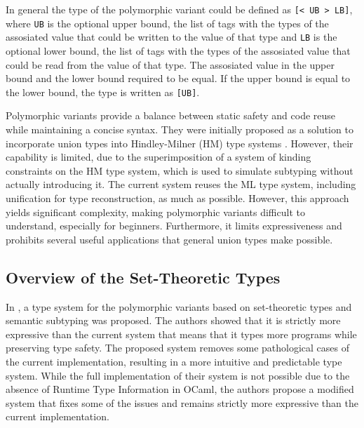 \documentclass[a4paper,11pt,oneside]{article}
\theoremstyle{definition}
\begin{document}
In general the type of the polymorphic variant could be defined as \texttt{[< UB > LB]}, where \texttt{UB} is the optional upper bound, the list of tags with the types of the assosiated value that could be written to the value of that type and \texttt{LB} is the optional lower bound, the list of tags with the types of the assosiated value that could be read from the value of that type. The assosiated value in the upper bound and the lower bound required to be equal.
If the upper bound is equal to the lower bound, the type is written as \texttt{[UB]}.

Polymorphic variants provide a balance between static safety and code reuse while maintaining a concise syntax.
They were initially proposed as a solution to incorporate union types into Hindley-Milner (HM) type systems \cite{Garrigue_1998}.
However, their capability is limited, due to the superimposition of a system of kinding constraints on the HM type system, which is used to simulate subtyping without actually introducing it.
The current system reuses the ML type system, including unification for type reconstruction, as much as possible.
However, this approach yields significant complexity, making polymorphic variants difficult to understand, especially for beginners.
Furthermore, it limits expressiveness and prohibits several useful applications that general union types make possible.

\subsection{Overview of the Set-Theoretic Types}

In \cite{Castagna_2016}, a type system for the polymorphic variants based on set-theoretic types and semantic subtyping was proposed.
The authors showed that it is strictly more expressive than the current system that means that it types more programs while preserving type safety.
The proposed system removes some pathological cases of the current implementation, resulting in a more intuitive and predictable type system.
While the full implementation of their system is not possible due to the absence of Runtime Type Information in OCaml, the authors propose a modified system that fixes some of the issues and remains strictly more expressive than the current implementation.
\end{document}
